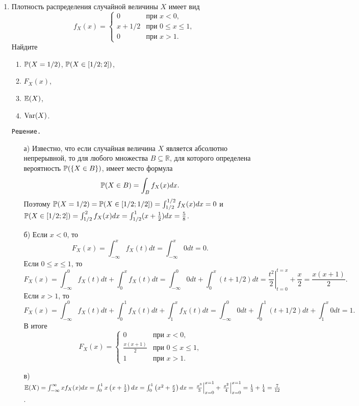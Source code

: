 \begin{enumerate}
\item Плотность распределения случайной величины $X$ имеет вид
\[
f_X(x) =          \begin{cases}
                     0     &   \text{при $x < 0$,} \\
                     x + 1/2   &   \text{при $0 \leq x \leq 1$,} \\
                     0     &   \text{при $x > 1$.}
                  \end{cases}
\]
Найдите
\begin{enumerate}
  \item $\P(X=1/2)$, $\P(X \in [1/2;2])$,
  \item $F_X(x)$,
  \item $\E(X)$,
  \item $\Var(X)$.
\end{enumerate}

\verb"Решение."
\begin{enumerate}
\item[а)] Известно, что если случайная величина $X$ является абсолютно непрерывной, то для любого множества $B \subseteq \mathbb{R}$, для которого определена вероятность $\P(\{X \in B\})$, имеет место формула
\[
\P(X \in B) = \int_{B}f_X(x)dx \text{.}
\]
Поэтому $ \P(X = 1/2) = \P(X \in [1/2;1/2]) = \int_{1/2}^{1/2}f_X(x)dx = 0$ и $\P(X \in [1/2;2]) = \int_{1/2}^{2}f_X(x)dx = \int_{1/2}^{1}(x+\frac{1}{2})dx =\frac{5}{8}$.

\item[б)] Если $x < 0$, то
\[
F_X(x) = \int_{-\infty}^{x}f_X(t)dt = \int_{-\infty}^{x}0dt = 0 \text{.}
\]
Если $0 \leq x \leq 1$, то
\[
F_X(x) = \int_{-\infty}^{0}f_X(t)dt + \int_{0}^{x}f_X(t)dt= \int_{-\infty}^{0}0dt + \int_{0}^{x}(t+1/2)dt = \left.\frac{t^2}{2}\right|_{t=0}^{t=x} + \frac{x}{2} = \frac{x(x+1)}{2} \text{.}
\]
Если $x > 1$, то
\[
F_X(x) = \int_{-\infty}^{0}f_X(t)dt + \int_{0}^{1}f_X(t)dt + \int_{1}^{x}f_X(t)dt = \int_{-\infty}^{0}0dt + \int_{0}^{1}(t+1/2)dt + \int_{1}^{x}0dt = 1 \text{.}
\]
В итоге
\[
F_X(x) =
                 \begin{cases}
                     0                   &   \text{при $x < 0$,} \\
                     \frac{x(x+1)}{2}   &   \text{при $0 \leq x \leq 1$,} \\
                     1                   &   \text{при $x > 1$.}
                  \end{cases}
\]

\item[в)] $\E(X) = \int_{-\infty}^{\infty}xf_X(x)dx = \int_{0}^{1}x\left(x+\frac{1}{2}\right)dx = \int_{0}^{1}\left(x^2+\frac{x}{2}\right)dx = \left.\frac{x^3}{3}\right|_{x=0}^{x=1} + \left.\frac{x^2}{4}\right|_{x=0}^{x=1} = \frac{1}{3} + \frac{1}{4} = \frac{7}{12}$.


\end{enumerate}
\end{enumerate}
